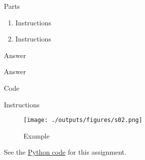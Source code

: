 


%
%

\newcommand{\hmwkTitle}{HW00}
\newcommand{\hmwkSubTitle}{Homework Template}
\newcommand{\hmwkDueDate}{September 25th. 2025}
\newcommand{\hmwkDueTime}{09:30 AM}
\newcommand{\hmwkClass}{ENAE 441 - 0101}
\newcommand{\hmwkClassTime}{09:30 AM}
\newcommand{\hmwkClassInstructor}{Dr. Martin}
\newcommand{\hmwkAuthorName}{\textbf{Vai Srivastava}}
\newcommand{\hmwkCompletionDate}{\today}



\maketitle

\pagebreak

\begin{hwkProblem}{1}{Parts} \label{hwk:p01}

	\begin{enumerate}
		\item \label{hwk:p01a} Instructions
		\item \label{hwk:p01b} Instructions
	\end{enumerate}

	\hwkSol{} \label{hwk:s01}

	\hwkPart{} \label{hwk:s01a}

	Answer

	\hwkPart{} \label{hwk:s01b}

	Answer

\end{hwkProblem}

\begin{hwkProblem}{2}{Code} \label{hwk:p02}

	Instructions

	\hwkSol{} \label{hwk:s02}

	\begin{figure}[H] \label{fig:s02}
		\begin{center}
			\texttt{[image: ./outputs/figures/s02.png]}
		\end{center}
		\caption{Example}
	\end{figure}

	\hwkCode{} \label{code:s02}

	See the \href{https://www.github.com/vaisriv/enae441-hw-template/blob/main/code/hw00.py}{Python code} for this assignment.

\end{hwkProblem}


